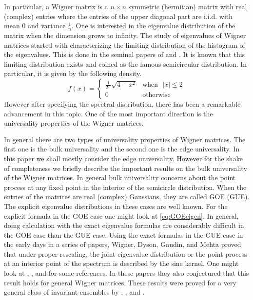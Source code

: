 \documentclass[12pt]{article}
\numberwithin{equation}{section}
\numberwithin{equation}{section}
\theoremstyle{definition}
\renewcommand{\1}{\bf 1}
\begin{document}
 In particular, a Wigner matrix is a $n \times n$ symmetric (hermitian) matrix with real (complex) entries where the entries of the upper diagonal part are i.i.d. with mean $0$ and variance $\frac{1}{n}$. One is interested in the eigenvalue distribution of the matrix when the dimension grows to infinity. 
 The study of eigenvalues of Wigner matrices started with characterizing the limiting distribution of the histogram of the eigenvalues. This is done in the seminal papers of \citet{wig1} and \citet{wig2}. It is known that this limiting distribution exists and coined as the famous semicircular distribution. In particular, it is given by the following density.
\begin{equation}\label{eq:semicircular}
 f(x)=\left\{
 \begin{array}{ll}
 \frac{1}{2\pi} \sqrt{4-x^2} & \text{when~ $|x|\le 2$}\\
 0 & \text{otherwise} 
 \end{array}
 \right.
\end{equation}  
However after specifying the spectral distribution, there has been a remarkable advancement in this topic. One of the most important direction is the universality properties of the Wigner matrices. 

In general there are two types of universality properties of Wigner matrices. The first one is the bulk universality and the second one is the edge universality. In this paper we shall mostly consider the edge universality. However for the shake of completeness we briefly describe the important results on the bulk universality of the Wigner matrices. In general bulk universality concerns about the point process at any fixed point in the interior of the semicircle distribution. When the entries of the matrices are real (complex) Gaussians, they are called GOE (GUE). The explicit eigenvalue distributions in these cases are well known. For the explicit formula in the GOE case one might look at \eqref{eq:GOEeigen}. In general, doing calculation with the exact eigenvalue formulas are considerably difficult in the GOE case than the GUE case. Using the exact formulas in the GUE case in the early days in a series of papers, Wigner, Dyson, Gaudin, and Mehta proved that under proper rescaling, the joint eigenvalue distribution or the point process at an interior point of the spectrum is described by the sine kernel. One might look at \citet{mehta1960statistical}, \citet{mehta1960density}, \citet{dyson1962statistical} and \citet{dyson1970correlations} for some references. In these papers they also conjectured that this result holds for general Wigner matrices. These results were proved for a very general class of invariant 
ensembles by \citet{deift1999strong}, \citet{deift1999uniform} , \citet{bleher1999semiclassical} and \citet{pastur2008bulk}.   
 
\end{document}
